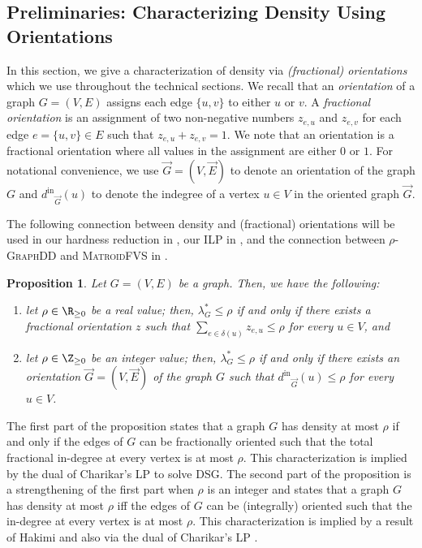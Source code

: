 \documentclass{article}
\newtheorem{proposition}{Proposition}[section]
\newcommand{\indegree}{\ensuremath{d^{\text{in}}}\xspace}
\newcommand{\dsg}{\textsc{DSG}\xspace}
\newcommand{\mfvs}{\textsc{MatroidFVS}\xspace}
\newcommand{\densitydeletionset}{\textsc{GraphDD}\xspace}
\newcommand{\rhodensitydeletionset}{\ensuremath{\rho\text{-}}\densitydeletionset\xspace}
\begin{document}
\subsection{Preliminaries: Characterizing Density Using Orientations}\label{sec:preliminaries}
In this section, we give a characterization of density via \emph{(fractional) orientations} which we use throughout the technical sections. We recall that an \emph{orientation} of a graph $G=(V,E)$
assigns each edge $\{u,v\}$ to either $u$ or $v$. A \emph{fractional orientation} is an assignment of
two non-negative numbers $z_{e,u}$ and $z_{e,v}$ for each edge $e=\{u,v\} \in E$ such that 
$z_{e, u}+ z_{e,v}=1$. We note that an orientation is a fractional orientation where all values in the assignment are either $0$ or $1$. For notational convenience, we use $\vec{G} = (V, \vec{E})$ to denote an orientation of the graph $G$ and $\indegree_{\vec{G}}(u)$ to denote the indegree of a vertex $u \in V$ in the oriented graph $\vec{G}$.

The following connection between density and (fractional) orientations will be used in our hardness reduction in , our ILP in  , and the connection between \rhodensitydeletionset and \mfvs in . 
\begin{proposition}\label{thm:orientation-characterization}
Let $G=(V, E)$ be a graph. Then, we have the following:
\begin{enumerate}
    \item let $\rho \in \R_{\geq 0}$ be a real value; then, $\lambda^*_G\le \rho$ if and only if there exists a fractional orientation $z$ such that $\sum_{e\in \delta(u)}z_{e,u}\le \rho$ for every $u\in V$, and
    \item let $\rho \in \Z_{\geq 0}$ be an integer value; then, $\lambda^*_G\le \rho$ if and only if there exists an orientation $\vec{G} = (V, \vec{E})$ of the graph $G$ such that $\indegree_{\vec{G}}(u) \leq \rho$ for every $u\in V$.
\end{enumerate}
\end{proposition}
The first part of the proposition states that a graph $G$ has density at most $\rho$
if and only if the edges of $G$ can be fractionally oriented such that the total fractional in-degree at every vertex is at most $\rho$. This characterization is implied by the dual of Charikar's LP \cite{charikar_greedy_2000} to solve \dsg.
The second part of the proposition is a strengthening of the first part when $\rho$ is an integer and states that a graph $G$ has density at most $\rho$ iff the edges of $G$ can be (integrally) oriented such that the in-degree at every vertex is at most $\rho$.  This characterization is implied by a result of Hakimi \cite{Frank-book} and also via the dual of Charikar's LP \cite{charikar_greedy_2000}.   
\end{document}
